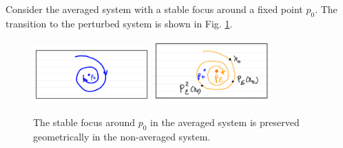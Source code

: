 \begin{ex}
	Consider the averaged system with a stable focus around a fixed point $p_0 $. The transition to the perturbed system is shown in Fig. \ref{fig:avg_ex_3}.
	\begin{figure}[h!]
		\centering
		\includegraphics[width=0.4\textwidth]{figures/ch5/6avg_ex_3a.png}
		\includegraphics[width=0.4\textwidth]{figures/ch5/7avg_ex_3b.png}
		\caption{The stable focus around $p_0$ in the averaged system is preserved geometrically in the non-averaged system.}
		\label{fig:avg_ex_3}
	\end{figure}
	
\end{ex}
